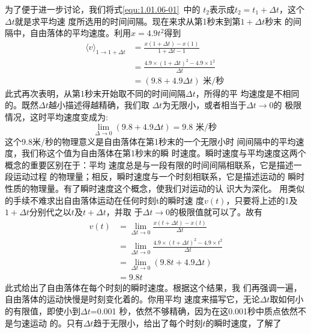     为了便于进一步讨论，我们将式\ref{equ:1.01.06-01}~中的
$t_2$表示成$t_2=t_1+\Delta t$，这个$\Delta t$就是求平均速
度所选用的时间间隔。现在来求从第1秒末到第$1+\Delta t$秒末
的间隔中，自由落体的平均速度。利用$x=4.9t^2$得到
\begin{equation*}
    \begin{aligned}
        \langle v\rangle_{1 \rightarrow 1+\Delta t} &=\frac{x(1+\Delta t)-x(1)}{1+\Delta t-1} \\
        &=\frac{4.9 \times(1+\Delta t)^{2}-4.9 \times 1^{2}}{\Delta t} \\
        &=(9.8+4.9 \Delta t) \text { 米/秒 }
    \end{aligned}
\end{equation*}
此式再次表明，从第1秒末开始取不同的时间间隔$\Delta t$，所得的平
均速度是不相同的。既然$\Delta t$越小描述得越精确，我们取
$\Delta t$为无限小，或者相当于$\Delta t \rightarrow 0$的
极限情况，这时平均速度变成为:
\begin{equation*}
    \lim _{\Delta \rightarrow 0}(9.8+4.9 \Delta t)=9.8 \text { 米/秒 }
\end{equation*}
这个9.8米/秒的物理意义是自由落体在第1秒末的一个无限小时
间间隔中的平均速度，我们称这个值为自由落体在第1秒末的瞬
时速度。瞬时速度与平均速度这两个概念的重要区别在于：平均
速度总是与一段有限的时间间隔相联系，它是描述一段运动过程
的物理量；相反，瞬时速度与一个时刻相联系，它是描述运动的
瞬时性质的物理量。有了瞬时速度这个概念，使我们对运动的认
识大为深化。
    用类似的手续不难求出自由落体运动在任何时刻t的瞬时速
度$v(t)$，只要将上述的1及$1+\Delta t$分别代之以$t$及$t+\Delta t$，并取
于$\Delta t \rightarrow 0$的极限值就可以了。故有
\begin{equation}
    \begin{aligned}
        v(t) &=\lim _{\Delta t \rightarrow 0} \frac{x(t+\Delta t)-x(t)}{\Delta t} \\
        &=\lim _{\Delta t \rightarrow 0} \frac{4.9 \times(t+\Delta t)^{2}-4.9 \times t^{2}}{\Delta t} \\
        &=\lim _{\Delta t \rightarrow 0}(9.8 t+4.9 \Delta t) \\
        &=9.8 t \label{equ:1.01.06-02}
    \end{aligned}
\end{equation}
此式给出了自由落体在每个时刻的瞬时速度。根据这个结果，我
们再强调一遍，自由落体的运动快慢是时刻变化着的。你用平均
速度来描写它，无论$\Delta t$取如何小的有限值，即使小到$\Delta t$=0.001
秒，依然不够精确，因为在这0.001秒中质点依然不是匀速运动
的。只有$\Delta t$趋于无限小，给出了每个时刻$t$的瞬时速度，了解了
